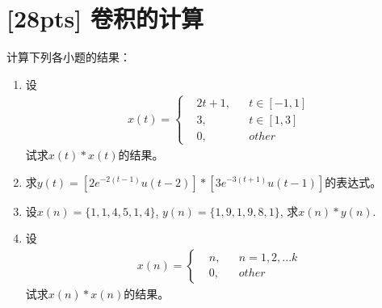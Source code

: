\documentclass[a4paper,UTF8]{article}
\numberwithin{equation}{section}
\begin{document}
\section{[28pts] 卷积的计算 }
计算下列各小题的结果：
\begin{enumerate}[(1)]
	\item 设
	\begin{equation*}
        \begin{aligned}
        x(t)=\left\{
        \begin{aligned}
        & 2t+1, && t\in[-1,1]\\
        & 3, && t\in[1,3]\\
        & 0, && other
        \end{aligned}
        \right.
        \end{aligned}
    \end{equation*}
    试求$x(t)*x(t)$的结果。
	\item 求$y(t)=[2e^{-2(t-1)}u(t-2)]*[3e^{-3(t+1)}u(t-1)]$的表达式。
	\item 设$x(n)=\{1,1,4,5,1,4\}$, $y(n)=\{1,9,1,9,8,1\}$, 求$x(n)*y(n)$.
	\item 设
	\begin{equation*}
        \begin{aligned}
        x(n)=\left\{
        \begin{aligned}
        & n, && n=1,2,...k\\
        & 0, && other
        \end{aligned}
        \right.
        \end{aligned}
    \end{equation*}
    试求$x(n)*x(n)$的结果。
\end{enumerate}
\end{document}
